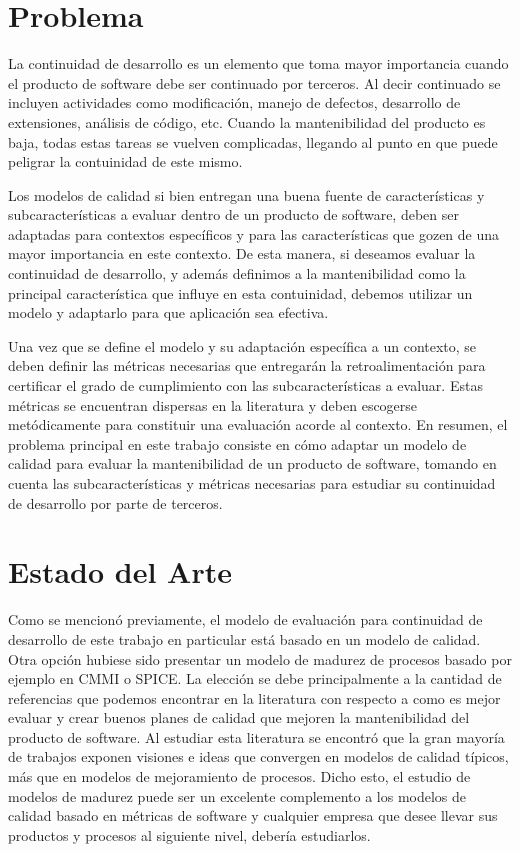 \documentclass[letterpaper]{article}
\begin{document}
\section{Problema}
La continuidad de desarrollo es un elemento que toma mayor importancia cuando el producto de software debe ser
continuado por terceros. Al decir continuado se incluyen actividades como modificación, manejo de defectos, desarrollo
de extensiones, análisis de código, etc. Cuando la mantenibilidad del producto es baja, todas estas tareas se vuelven
complicadas, llegando al punto en que puede peligrar la contuinidad de este mismo.

Los modelos de calidad si bien entregan una buena fuente de características y subcaracterísticas a evaluar dentro
de un producto de software, deben ser adaptadas para contextos específicos y para las características que gozen de una
mayor importancia en este contexto. De esta manera, si deseamos evaluar la continuidad de desarrollo, y además definimos
a la mantenibilidad como la principal característica que influye en esta contuinidad, debemos utilizar un modelo y adaptarlo
para que aplicación sea efectiva.

Una vez que se define el modelo y su adaptación específica a un contexto, se deben definir las métricas necesarias que entregarán
la retroalimentación para certificar el grado de cumplimiento con las subcaracterísticas a evaluar. Estas métricas
se encuentran dispersas en la literatura y deben escogerse metódicamente para constituir una evaluación acorde al contexto.
En resumen, el problema principal en este trabajo consiste en cómo adaptar un modelo de calidad para evaluar la mantenibilidad
de un producto de software, tomando en cuenta las subcaracterísticas y métricas necesarias para estudiar su continuidad de
desarrollo por parte de terceros.

\section{Estado del Arte}
Como se mencionó previamente, el modelo de evaluación para continuidad de desarrollo
 de este trabajo en particular está basado en un modelo de calidad. Otra opción hubiese sido presentar un modelo
de madurez de procesos basado por ejemplo en CMMI o SPICE. La elección se debe
principalmente a la cantidad de referencias que podemos encontrar en la literatura
con respecto a como es mejor evaluar y crear buenos planes de calidad que mejoren la mantenibilidad
del producto de software. Al estudiar esta literatura se encontró que la gran mayoría
de trabajos exponen visiones e ideas que convergen en modelos de calidad típicos, más
que en modelos de mejoramiento de procesos.
Dicho esto, el estudio de modelos de madurez puede ser un excelente complemento a los modelos de
calidad basado en métricas de software y cualquier empresa que desee llevar sus productos
y procesos al siguiente nivel, debería estudiarlos.
\end{document}
